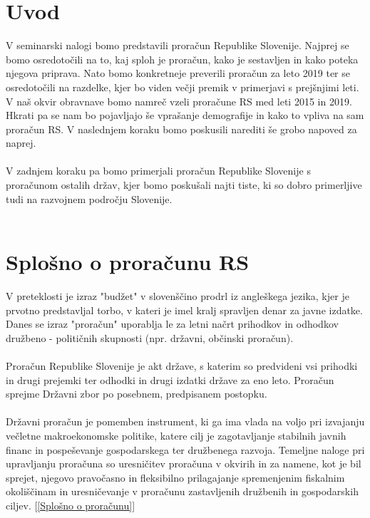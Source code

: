 \documentclass[12pt, a4paper]{article}
\begin{document}
\newpage

\tableofcontents
\vspace{20mm}

\newpage
\section[Uvod]{Uvod}
V seminarski nalogi bomo predstavili proračun Republike Slovenije. Najprej se bomo osredotočili na to, kaj sploh je proračun, kako je sestavljen in kako poteka njegova priprava. Nato bomo konkretneje preverili proračun za leto 2019 ter se osredotočili na razdelke, kjer bo viden večji premik v primerjavi s prejšnjimi leti. V naš okvir obravnave bomo namreč vzeli proračune RS med leti 2015 in 2019. Hkrati pa se nam bo pojavljajo še vprašanje demografije in kako to vpliva na sam proračun RS. V naslednjem koraku bomo poskusili narediti še grobo napoved za naprej. \\
\\
V zadnjem koraku pa  bomo primerjali proračun Republike Slovenije s proračunom ostalih držav, kjer bomo poskušali najti tiste, ki so dobro primerljive tudi na razvojnem področju Slovenije. 
\\
\\
\section[Splošno o proračunu RS]{Splošno o proračunu RS}
V preteklosti je izraz "budžet" v slovenščino prodrl iz angleškega jezika, kjer je prvotno predstavljal torbo, v kateri je imel kralj spravljen denar za javne izdatke. \\
Danes se izraz "proračun" uporablja le za letni načrt prihodkov in odhodkov družbeno - političnih skupnosti (npr. državni, občinski proračun).
 \\
\\
Proračun Republike Slovenije je akt države, s katerim so predvideni vsi prihodki in drugi prejemki ter odhodki in drugi izdatki države za eno leto. Proračun sprejme Državni zbor po posebnem, predpisanem postopku.
\\
\\
Državni proračun je pomemben instrument, ki ga ima vlada na voljo pri izvajanju večletne makroekonomske politike, katere cilj je zagotavljanje stabilnih javnih financ in pospeševanje gospodarskega ter družbenega razvoja. Temeljne naloge pri upravljanju proračuna so uresničitev proračuna v okvirih in za namene, kot je bil sprejet, njegovo pravočasno in fleksibilno prilagajanje spremenjenim fiskalnim okoliščinam in uresničevanje v proračunu zastavljenih družbenih in gospodarskih ciljev. [\ref{Splošno o proračunu}]
\end{document}
